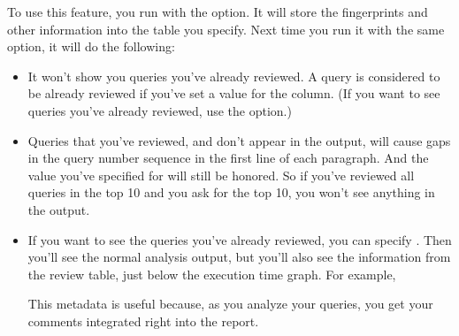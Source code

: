 \documentclass[letterpaper,10pt,english]{sphinxmanual}
\begin{document}
\sphinxAtStartPar
To use this feature, you run  with the {\hyperref[\detokenize{mariadb-query-digest:cmdoption-mariadb-query-digest-review}]{}} option.  It
will store the fingerprints and other information into the table you specify.
Next time you run it with the same option, it will do the following:
\begin{itemize}
\item {} 
\sphinxAtStartPar
It won’t show you queries you’ve already reviewed.  A query is considered to be
already reviewed if you’ve set a value for the  column.  (If you
want to see queries you’ve already reviewed, use the {\hyperref[\detokenize{mariadb-query-digest:cmdoption-mariadb-query-digest-report-all}]{}} option.)

\item {} 
\sphinxAtStartPar
Queries that you’ve reviewed, and don’t appear in the output, will cause gaps in
the query number sequence in the first line of each paragraph.  And the value
you’ve specified for {\hyperref[\detokenize{mariadb-query-digest:cmdoption-mariadb-query-digest-limit}]{}} will still be honored.  So if you’ve reviewed all
queries in the top 10 and you ask for the top 10, you won’t see anything in the
output.

\item {} 
\sphinxAtStartPar
If you want to see the queries you’ve already reviewed, you can specify
{\hyperref[\detokenize{mariadb-query-digest:cmdoption-mariadb-query-digest-report-all}]{}}.  Then you’ll see the normal analysis output, but you’ll
also see the information from the review table, just below the execution time
graph.  For example,

\begin{sphinxVerbatim}[commandchars=\\\{\}]
\end{sphinxVerbatim}

\sphinxAtStartPar
This metadata is useful because, as you analyze your queries, you get
your comments integrated right into the report.

\end{itemize}
\end{document}
